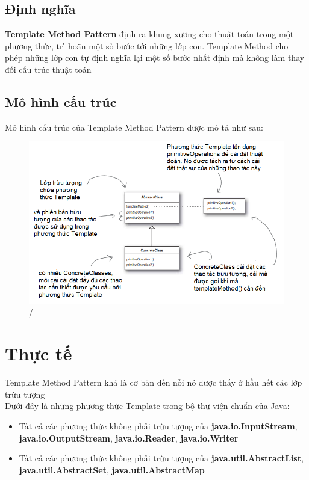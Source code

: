 \subsection{Định nghĩa}

\textbf{Template Method Pattern} định ra khung xương cho thuật toán trong một phương thức, trì hoãn một số bước tới những lớp con. Template Method cho phép những lớp con tự định nghĩa lại một số bước nhất định mà không làm thay đổi cấu trúc thuật toán

\subsection{Mô hình cấu trúc}

Mô hình cấu trúc của Template Method Pattern được mô tả như sau:

\begin{figure}[!htb]
    \centering
    \includegraphics[width=\textwidth]{fig/Template/TemplateDiagram.png}/
\end{figure}

\section{Thực tế}
Template Method Pattern khá là cơ bản đến nỗi nó được thấy ở hầu hết các lớp trừu tượng \\[0.1in]
Dưới đây là những phương thức Template trong bộ thư viện chuẩn của Java:
\begin{itemize}
    \item Tất cả các phương thức không phải trừu tượng của \textbf{java.io.InputStream}, \textbf{java.io.OutputStream}, \textbf{java.io.Reader}, \textbf{java.io.Writer}
    \item Tất cả các phương thức không phải trừu tượng của
    \textbf{java.util.AbstractList}, \textbf{java.util.AbstractSet}, \textbf{java.util.AbstractMap}
\end{itemize}

\newpage